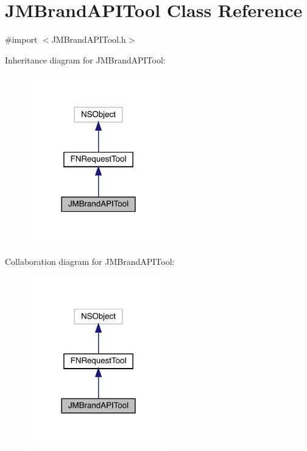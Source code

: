\hypertarget{interface_j_m_brand_a_p_i_tool}{}\section{J\+M\+Brand\+A\+P\+I\+Tool Class Reference}
\label{interface_j_m_brand_a_p_i_tool}


{\ttfamily \#import $<$J\+M\+Brand\+A\+P\+I\+Tool.\+h$>$}



Inheritance diagram for J\+M\+Brand\+A\+P\+I\+Tool\+:\nopagebreak
\begin{figure}[H]
\begin{center}
\leavevmode
\includegraphics[width=170pt]{interface_j_m_brand_a_p_i_tool__inherit__graph}
\end{center}
\end{figure}


Collaboration diagram for J\+M\+Brand\+A\+P\+I\+Tool\+:\nopagebreak
\begin{figure}[H]
\begin{center}
\leavevmode
\includegraphics[width=170pt]{interface_j_m_brand_a_p_i_tool__coll__graph}
\end{center}
\end{figure}
